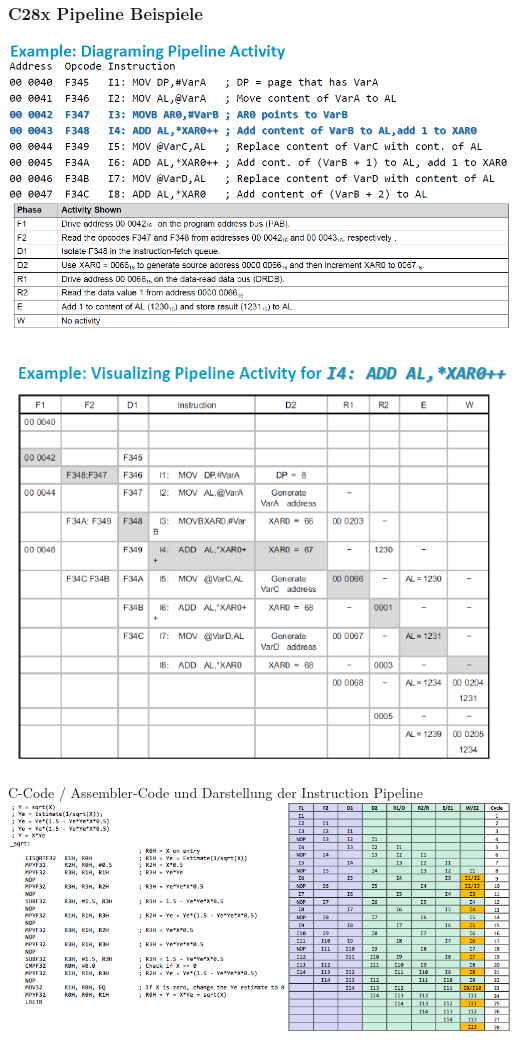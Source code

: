 \subsubsection{C28x Pipeline Beispiele}
\vspace{-2\baselineskip}
\begin{minipage}{0.53\textwidth}
  \includegraphics[width = 1\linewidth]{images/Plattformen/Example_pipeline}
\end{minipage}
\begin{minipage}{0.47\textwidth}
  \includegraphics[width = 1\linewidth]{images/Plattformen/Example_pipeline_activity}
\end{minipage}
\begin{minipage}{0.75\textwidth}
\flushleft
  C-Code / Assembler-Code und Darstellung der Instruction Pipeline
  \includegraphics[width = 1\linewidth]{images/Plattformen/Example_pipeline_assembler}
\end{minipage}
